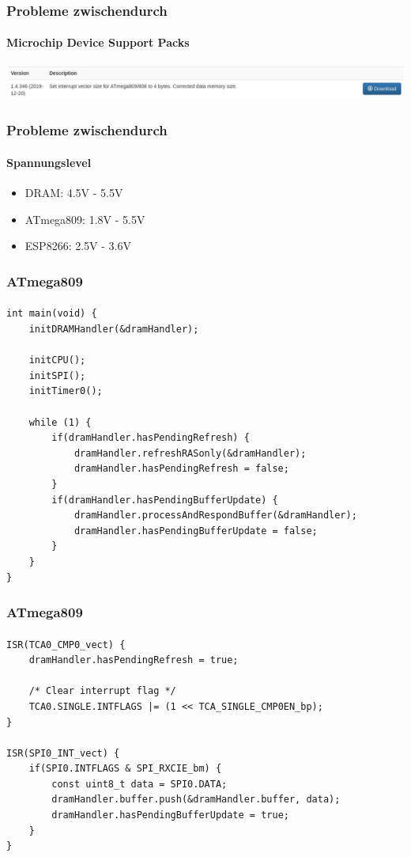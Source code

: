 \documentclass{beamer}
\begin{document}
\begin{frame}

	\frametitle{Probleme zwischendurch}
	\framesubtitle{Microchip Device Support Packs}
	\begin{center}
		\includegraphics[scale=0.4]{images/atmega_definition_update.png}
	\end{center}
	
\end{frame}

\begin{frame}

	\frametitle{Probleme zwischendurch}
	\framesubtitle{Spannungslevel}
	\begin{itemize}
		\item DRAM: 4.5V - 5.5V
		\item ATmega809: 1.8V - 5.5V
		\item ESP8266: 2.5V - 3.6V
	\end{itemize}
	
\end{frame}

\begin{frame}[containsverbatim]

	\frametitle{ATmega809}
	\framesubtitle{}
	\begin{lstlisting}[style=CStyle]
int main(void) {
	initDRAMHandler(&dramHandler);

	initCPU();
	initSPI();
	initTimer0();
	
	while (1) {
		if(dramHandler.hasPendingRefresh) {
			dramHandler.refreshRASonly(&dramHandler);
			dramHandler.hasPendingRefresh = false;
		}
		if(dramHandler.hasPendingBufferUpdate) {
			dramHandler.processAndRespondBuffer(&dramHandler);
			dramHandler.hasPendingBufferUpdate = false;
		}
	}
}
	\end{lstlisting}
	
\end{frame}

\begin{frame}[containsverbatim]

	\frametitle{ATmega809}
	\framesubtitle{}
	\begin{lstlisting}[style=CStyle]
ISR(TCA0_CMP0_vect) {
	dramHandler.hasPendingRefresh = true;

	/* Clear interrupt flag */
	TCA0.SINGLE.INTFLAGS |= (1 << TCA_SINGLE_CMP0EN_bp);
}

ISR(SPI0_INT_vect) {
	if(SPI0.INTFLAGS & SPI_RXCIE_bm) {
		const uint8_t data = SPI0.DATA;
		dramHandler.buffer.push(&dramHandler.buffer, data);
		dramHandler.hasPendingBufferUpdate = true;
	}
}
	\end{lstlisting}
	
\end{frame}
\end{document}
